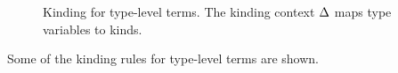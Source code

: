 \documentclass[10pt,preprint]{sigplanconf}
\begin{document}
{\begin{figure}[t]
\begin{mathpar}
%
\end{mathpar}
\caption{\small Kinding for type-level terms. The kinding context $\tvarCtx$ maps type variables to kinds.}
\label{tlkind}
\end{figure} 
Some of the kinding rules for type-level terms are shown.
%
%
%
}
\end{document}
